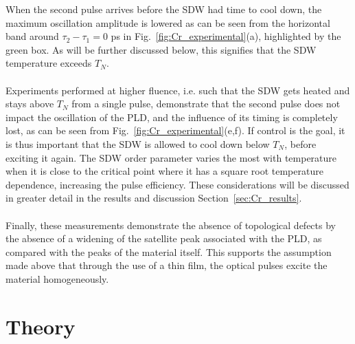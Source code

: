 When the second pulse arrives before the SDW had time to cool down, the maximum oscillation amplitude is lowered as can be seen from the horizontal band around $\tau_2 - \tau_1 = 0$ ps in Fig.~\ref{fig:Cr_experimental}(a), highlighted by the green box.
As will be further discussed below, this signifies that the SDW temperature exceeds $T_N$.
\\\\
Experiments performed at higher fluence, i.e. such that the SDW gets heated and stays above $T_N$ from a single pulse, demonstrate that the second pulse does not impact the oscillation of the PLD, and the influence of its timing is completely lost, as can be seen from Fig.~\ref{fig:Cr_experimental}(e,f).
If control is the goal, it is thus important that the SDW is allowed to cool down below $T_N$, before exciting it again.
The SDW order parameter varies the most with temperature when it is close to the critical point where it has a square root temperature dependence, increasing the pulse efficiency.
These considerations will be discussed in greater detail in the results and discussion Section~\ref{sec:Cr_results}.
\\\\
Finally, these measurements demonstrate the absence of topological defects by the absence of a widening of the satellite peak associated with the PLD, as compared with the peaks of the material itself.
This supports the assumption made above that through the use of a thin film, the optical pulses excite the material homogeneously. 
\section{Theory}

